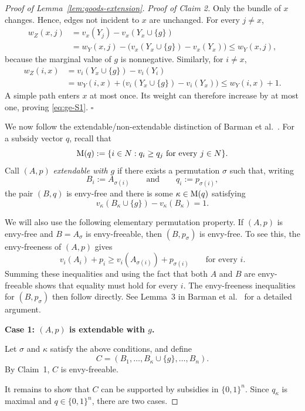 \begin{proof}[Proof of Lemma~\ref{lem:goods-extension}]
\smallskip
\noindent
\emph{Proof of Claim 2.}
Only the bundle of $x$ changes. Hence, edges not incident to $x$ are unchanged.
For every $j\neq x$,
\[
\begin{aligned}
  w_Z(x,j)
  &=v_x(Y_j)-v_x(Y_x\cup\{g\})\\
  &=w_Y(x,j)
    -\bigl(v_x(Y_x\cup\{g\})-v_x(Y_x)\bigr)
  \leq w_Y(x,j),
\end{aligned}
\]
because the marginal value of $g$ is nonnegative. Similarly, for $i\neq x$,
\[
\begin{aligned}
  w_Z(i,x)
  &=v_i(Y_x\cup\{g\})-v_i(Y_i)\\
  &=w_Y(i,x)
    +\bigl(v_i(Y_x\cup\{g\})-v_i(Y_x)\bigr)
  \leq w_Y(i,x)+1.
\end{aligned}
\]
A simple path enters $x$ at most once. Its weight can therefore increase by at
most one, proving \eqref{eq:ge-S1}.
\hfill$\square$

\medskip
We now follow the extendable/non-extendable distinction of Barman et
al.~\cite{BKNS22}. For a subsidy vector $q$, recall that
\[
  \mathrm{M}(q):=\{i\in N:q_i\geq q_j\text{ for every }j\in N\}.
\]
Call $(A,p)$ \emph{extendable with $g$} if there exists a permutation $\sigma$
such that, writing
\[
  B_i:=A_{\sigma(i)}
  \qquad\text{and}\qquad
  q_i:=p_{\sigma(i)},
\]
the pair $(B,q)$ is envy-free and there is some $\kappa\in \mathrm{M}(q)$ satisfying
\begin{equation}\label{eq:ge-S2}
  v_\kappa(B_\kappa\cup\{g\})-v_\kappa(B_\kappa)=1.
\end{equation}

We will also use the following elementary permutation property. If $(A,p)$ is
envy-free and $B=A_\sigma$ is envy-freeable, then $(B,p_\sigma)$ is envy-free.
To see this, the envy-freeness of $(A,p)$ gives
\[
  v_i(A_i)+p_i
  \geq
  v_i(A_{\sigma(i)})+p_{\sigma(i)}
  \qquad\text{for every }i.
\]
Summing these inequalities and using the fact that both $A$ and $B$ are
envy-freeable shows that equality must hold for every $i$. The envy-freeness
inequalities for $(B,p_\sigma)$ then follow directly. See Lemma~3 in Barman et
al.~\cite{BKNS22} for a detailed argument.

\medskip
\noindent
\textbf{Case 1: $(A,p)$ is extendable with $g$.}

Let $\sigma$ and $\kappa$ satisfy the above conditions, and define
\[
  C=(B_1,\ldots,B_\kappa\cup\{g\},\ldots,B_n).
\]
By Claim~1, $C$ is envy-freeable.

It remains to show that $C$ can be supported by subsidies in $\{0,1\}^n$. Since
$q_\kappa$ is maximal and $q\in\{0,1\}^n$, there are two cases.


\end{proof}

